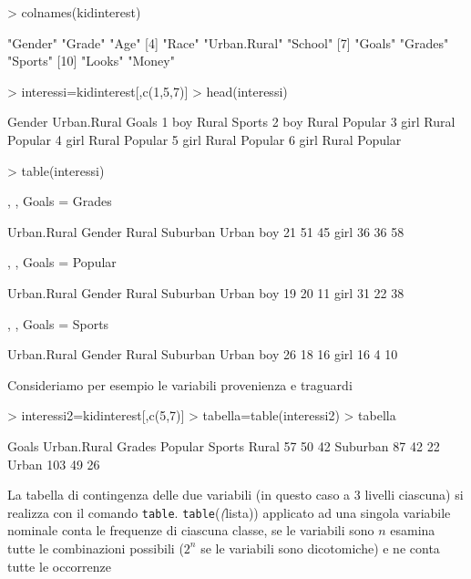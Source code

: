 \documentclass[onecolumn,12pt]{book}
\newcommand{\varia}[1]{\textsl{\textsf{#1}}}
\begin{document}
\begin{Schunk}
\begin{Sinput}
> colnames(kidinterest)
\end{Sinput}
\begin{Soutput}
 [1] "Gender"      "Grade"       "Age"        
 [4] "Race"        "Urban.Rural" "School"     
 [7] "Goals"       "Grades"      "Sports"     
[10] "Looks"       "Money"      
\end{Soutput}
\begin{Sinput}
> interessi=kidinterest[,c(1,5,7)]
> head(interessi)
\end{Sinput}
\begin{Soutput}
  Gender Urban.Rural   Goals
1    boy       Rural  Sports
2    boy       Rural Popular
3   girl       Rural Popular
4   girl       Rural Popular
5   girl       Rural Popular
6   girl       Rural Popular
\end{Soutput}
\begin{Sinput}
> table(interessi)
\end{Sinput}
\begin{Soutput}
, , Goals = Grades

      Urban.Rural
Gender Rural Suburban Urban
  boy     21       51    45
  girl    36       36    58

, , Goals = Popular

      Urban.Rural
Gender Rural Suburban Urban
  boy     19       20    11
  girl    31       22    38

, , Goals = Sports

      Urban.Rural
Gender Rural Suburban Urban
  boy     26       18    16
  girl    16        4    10
\end{Soutput}
\end{Schunk}
 Consideriamo per esempio le variabili provenienza e traguardi
\begin{Schunk}
\begin{Sinput}
> interessi2=kidinterest[,c(5,7)]
> tabella=table(interessi2)
> tabella
\end{Sinput}
\begin{Soutput}
           Goals
Urban.Rural Grades Popular Sports
   Rural        57      50     42
   Suburban     87      42     22
   Urban       103      49     26
\end{Soutput}
\end{Schunk}

La tabella di contingenza delle due variabili (in questo caso a 3  livelli ciascuna) si realizza con il comando
\texttt{table}.
\texttt{table}(\varia(lista))
applicato ad una singola variabile nominale conta le frequenze di ciascuna classe, se le variabili sono $n$ esamina tutte le combinazioni possibili ($2^n$ se le variabili sono dicotomiche) e ne conta tutte le occorrenze
\end{document}
